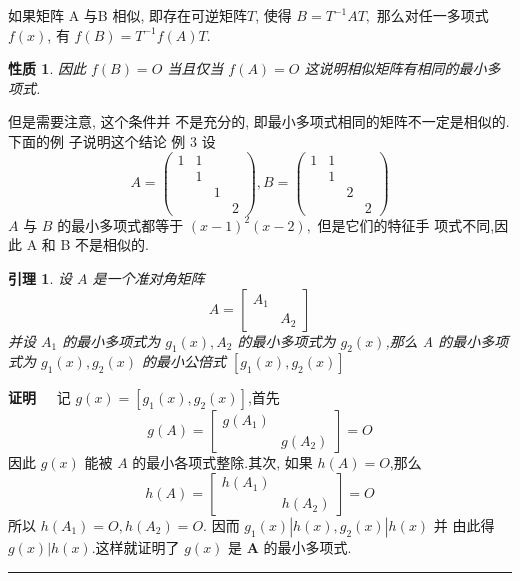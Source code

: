 \documentclass[13pt]{beamer}
\newtheorem{lem}{引理}
\newtheorem*{prop}{性质}
\def\qed{\nopagebreak\hfill{\rule{4pt}{7pt}}\medbreak}
\def\pf{{\bf 证明~~ }}
\begin{document}
\begin{frame}
如果矩阵 A 与B 相似, 即存在可逆矩阵$T$, 使得 ${B}={T}^{-1} {A T},$ 那么对任一多项式
$f(x)$, 有 $f({B})={T}^{-1} f({A}) {T} .$ 
\begin{prop}
因此 $f({B})={O}$ 当且仅当 $f({A})={O}$
这说明相似矩阵有相同的最小多项式.
\end{prop}
但是需要注意, 这个条件并 不是充分的, 即最小多项式相同的矩阵不一定是相似的.下面的例 子说明这个结论 例 3 设
\[
{A}=\left(\begin{array}{cccc}
1 & 1 && \\
& 1&& \\
&& 1&\\
&&&2
\end{array}\right), 
{B}=\left(\begin{array}{cccc}
1 & 1 &  &\\
& 1  &&\\
& & 2 &\\
& & &2
\end{array}\right)
\]
${A}$ 与 ${B}$ 的最小多项式都等于 $(x-1)^{2}(x-2),$ 但是它们的特征手 项式不同,因此 A 和 B 不是相似的.
\end{frame}

\begin{frame}
\small{
\begin{lem}
设 $A$ 是一个准对角矩阵
\[
{A}=\left[\begin{array}{ll}
{A}_{1} & \\
& {A}_{2}
\end{array}\right]
\]
并设 $A_{1}$ 的最小多项式为 $g_{1}(x), {A}_{2}$ 的最小多项式为 $g_{2}(x)$,那么 A 的最小多项式为 $g_{1}(x), g_{2}(x)$ 的最小公倍式 $\left[g_{1}(x), g_{2}(x)\right]$
\end{lem}
\pf 
记 $g(x)=\left[g_{1}(x), g_{2}(x)\right]$,首先
\[
g({A})=\left[\begin{array}{cc}
g\left({A}_{1}\right) & \\
& g\left({A}_{2}\right)
\end{array}\right]={O}
\]
因此 $g(x)$ 能被 $A$ 的最小各项式整除.其次, 如果 $h({A})={O}$,那么
\[
h({A})=\left[\begin{array}{cc}
h\left({A}_{1}\right) & \\
& h\left({A}_{2}\right)
\end{array}\right]={O}
\]
所以 $h\left({A}_{1}\right)={O}, h\left({A}_{2}\right)={O} .$ 因而 $g_{1}(x)\left|h(x), g_{2}(x)\right| h(x)$ 并
由此得 $g(x) | h(x)$.这样就证明了 $g(x)$ 是 $\mathbf{A}$ 的最小多项式.
\qed}
\end{frame}
\end{document}
